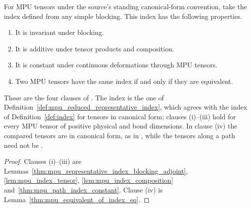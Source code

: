 \begin{theorem}
    \label{IndexTh}
    \leanok
    For MPU tensors under the source's standing canonical-form convention, take
    the index defined from any simple blocking. This index has the following
    properties.
    \begin{enumerate}
        \item It is invariant under blocking.
        \item It is additive under tensor products and composition.
        \item It is constant under continuous deformations through MPU tensors.
        \item Two MPU tensors have the same index if and only if they are
              equivalent.
    \end{enumerate}
    These are the four clauses of \cite[Theorem~IV.6]{Cirac2017MPU}. The
    index is the one of Definition~\ref{def:mpu_reduced_representative_index},
    which agrees with the index of Definition~\ref{def:index} for tensors in
    canonical form; clauses (i)--(iii) hold for every MPU tensor of positive
    physical and bond dimensions. In clause (iv) the compared tensors are in
    canonical form, as in \cite[lines~708--714]{Cirac2017MPU}, while the
    tensors along a path need not be \cite[lines~733--736]{Cirac2017MPU}.
\end{theorem}

\begin{proof}\leanok
    Clauses (i)--(iii) are
    Lemmas~\ref{thm:mpu_representative_index_blocking_adjoint},
    \ref{lem:mpu_index_tensor},
    \ref{lem:mpu_index_composition}
    and~\ref{thm:mpu_path_index_constant}. Clause (iv) is
    Lemma~\ref{thm:mpu_equivalent_of_index_eq}.
\end{proof}

